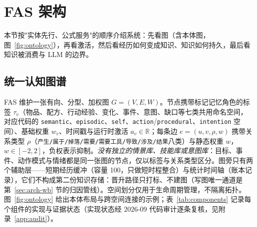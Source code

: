 \documentclass[10pt,a4paper]{ctexart}
\begin{document}
\section{FAS 架构}
\label{sec:arch}

本节按"实体先行、公式服务"的顺序介绍系统：先看图（含本体图，图~\ref{fig:ontology}），再看激活，然后看经历如何变成知识、知识如何持久，最后看知识被消费与 LLM 的边界。

\subsection{统一认知图谱}
\label{sec:arch-graph}
FAS 维护一张有向、分型、加权图 $G=(V,E,W)$。节点携带标记记忆角色的标签 $\tau_v$（物品、配方、行动经验、变化、事件、意图、缺口等七类共用命名空间，对应代码的 \texttt{semantic}、\texttt{episodic}、\texttt{self}、\texttt{action}/\texttt{procedural}、\texttt{intention} 空间）、基础权重 $w_v$、时间戳与运行时激活 $a_v\in\mathbb{R}$；每条边 $e=(u,v,\rho,w)$ 携带关系类型 $\rho$（\texttt{产生/属于/掉落/需要/需要工具/导致/涉及/结果}八类）与静态权重 $w$，$w\in[-2,2]$，负权表示抑制。\emph{没有独立的情景库、技能库或意图库}：目标、事件、动作模式与情绪都是同一张图的节点，仅以标签与关系类型区分。图旁只有两个辅助层——短期经历缓冲（容量 100，只做短时程整合）与统计时间轴（账本记录），它们不构成第二份知识存储：晋升路径只打标、不建图（写图唯一通道是第~\ref{sec:arch-wb} 节的归因管线）。空间划分仅用于生命周期管理，不隔离拓扑。图~\ref{fig:ontology} 给出本体布局与跨空间连接的示例；表~\ref{tab:components} 记录每个组件的实现与证据状态（实现状态经 2026-09 代码审计逐条复核，见附录~\ref{app:audit}）。
\end{document}
